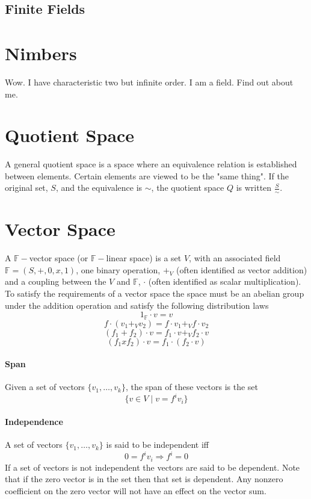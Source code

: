 \documentclass[a4paper]{scrartcl}
\begin{document}
\subsection{Finite Fields}

\section{Nimbers}
Wow. I have characteristic two but infinite order. I am a field. Find out about me.

\section{Quotient Space}
A general quotient space is a space where an equivalence relation is established between elements. Certain elements are viewed to be the "same thing". If the original set, $S$, and the equivalence is $\sim$, the quotient space $Q$ is written $\frac{S}{\sim}$.

\section{Vector Space}
A $\mathbb{F}-$vector space (or $\mathbb{F}-$linear space) is a set $V$, with an associated field $\mathbb{F}=(S,+,0,x,1)$, one binary operation, $+_{V}$ (often identified as vector addition) and a coupling between the $V$ and $\mathbb{F}$, $\cdot$ (often identified as scalar multiplication). To satisfy the requirements of a vector space the space must be an abelian group under the addition operation and satisfy the following distribution laws
$$1_\mathbb{F}\cdot v = v$$
$$f \cdot (v_{1} +_{V} v_{2}) = f\cdot v_{1} +_{V} f\cdot v_{2}$$
$$(f_{1} + f_{2})\cdot v = f_{1}\cdot v +_{V} f_{2} \cdot v$$
$$(f_{1} x f_{2})\cdot v = f_{1}\cdot(f_{2}\cdot v)$$

\paragraph{Span} 
Given a set of vectors $\{v_{1}, \ldots, v_{k}\}$, the span of these vectors is the set $$\{v\in V \mid v = f^{i}v_{i}\}$$
\paragraph{Independence}
A set of vectors $\{v_{1}, \ldots, v_{k}\}$ is said to be independent iff
$$0 = f^{i}v_{i} \Rightarrow f^{i} = 0$$
If a set of vectors is not independent the vectors are said to be dependent. Note that if the zero vector is in the set then that set is dependent. Any nonzero coefficient on the zero vector will not have an effect on the vector sum.
\end{document}
